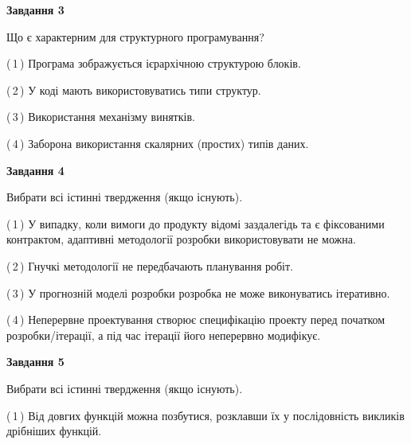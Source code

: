 \documentclass[10pt, ukrainian]{article}
\begin{document}
{\begin {large}
{\begin {center}\textbf{Завдання 3}\end {center}}\par
Що є характерним для структурного програмування?\par
\vspace{2mm}



(\,1\,) Програма зображується ієрархічною структурою блоків.%



(\,2\,) У коді мають використовуватись типи структур. %



(\,3\,) Використання механізму винятків. %



(\,4\,) Заборона використання скалярних (простих) типів даних. %


{\begin {center}\textbf{Завдання 4}\end {center}}\par
Вибрати всі істинні твердження (якщо існують).\par
\vspace{2mm}



(\,1\,) У випадку, коли вимоги до продукту відомі заздалегідь та є фіксованими контрактом, адаптивні методології розробки використовувати не можна. %



(\,2\,) Гнучкі методології не передбачають планування робіт. %



(\,3\,) У прогнозній моделі розробки розробка не може виконуватись ітеративно. %



(\,4\,) Неперервне проектування створює специфікацію проекту перед початком розробки/ітерації, а під час ітерації його неперервно модифікує.%


{\begin {center}\textbf{Завдання 5}\end {center}}\par
Вибрати всі істинні твердження (якщо існують).\par
\vspace{2mm}



(\,1\,) Від довгих функцій можна позбутися, розклавши їх у послідовність викликів дрібніших функцій. %




\end{large}}
\end{document}
